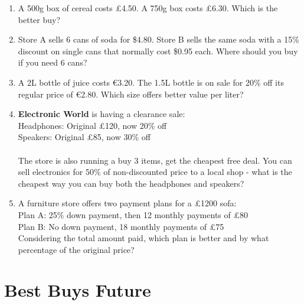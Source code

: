 \documentclass[12pt]{article}
\begin{document}
\begin{enumerate}[resume]
\item A 500g box of cereal costs £4.50. A 750g box costs £6.30. Which is the better buy?

\item Store A sells 6 cans of soda for \$4.80. Store B sells the same soda with a 15\% discount on single cans that normally cost \$0.95 each. Where should you buy if you need 6 cans?

\item A 2L bottle of juice costs €3.20. The 1.5L bottle is on sale for 20\% off its regular price of €2.80. Which size offers better value per liter?

\item \textbf{Electronic World} is having a clearance sale: \\
Headphones: Original £120, now 20\% off \\
Speakers: Original £85, now 30\% off \\ \\
The store is also running a buy 3 items, get the cheapest free deal. You can sell electronics for 50\% of non-discounted price to a local shop - what is the cheapest way you can buy both the headphones and speakers?

\item A furniture store offers two payment plans for a £1200 sofa: \\
Plan A: 25\% down payment, then 12 monthly payments of £80 \\
Plan B: No down payment, 18 monthly payments of £75 \\
Considering the total amount paid, which plan is better and by what percentage of the original price?
\end{enumerate}

\vspace{2cm}

\section*{Best Buys Future}
\end{document}
